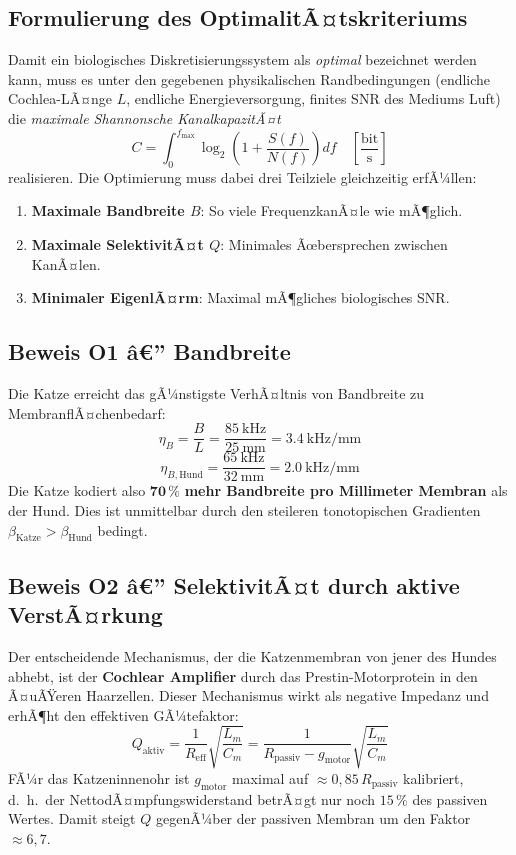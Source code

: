 ﻿\documentclass[12pt,a4paper,titlepage]{report}
\begin{document}
\subsection{Formulierung des OptimalitÃ¤tskriteriums}

Damit ein biologisches Diskretisierungssystem als \emph{optimal} bezeichnet werden kann,
muss es unter den gegebenen physikalischen Randbedingungen
(endliche Cochlea-LÃ¤nge $L$, endliche Energieversorgung, finites SNR des Mediums Luft)
die \emph{maximale Shannonsche KanalkapazitÃ¤t}
\[
C = \int_0^{f_{\max}} \log_2\!\left(1 + \frac{S(f)}{N(f)}\right)df \quad \left[\frac{\mathrm{bit}}{\mathrm{s}}\right]
\]
realisieren. Die Optimierung muss dabei drei Teilziele gleichzeitig erfÃ¼llen:
\begin{enumerate}[leftmargin=2em, label=\textbf{(O\arabic*)}]
\item \textbf{Maximale Bandbreite $B$}: So viele FrequenzkanÃ¤le wie mÃ¶glich.
\item \textbf{Maximale SelektivitÃ¤t $Q$}: Minimales Ãœbersprechen zwischen KanÃ¤len.
\item \textbf{Minimaler EigenlÃ¤rm}: Maximal mÃ¶gliches biologisches SNR.
\end{enumerate}

\subsection{Beweis O1 â€” Bandbreite}

Die Katze erreicht das gÃ¼nstigste VerhÃ¤ltnis von Bandbreite zu MembranflÃ¤chenbedarf:
\[
\eta_B = \frac{B}{L} = \frac{\SI{85}{\kilo\hertz}}{\SI{25}{\milli\meter}}
= \SI{3.4}{\kilo\hertz\per\milli\meter}
\]
\[
\eta_{B,\text{Hund}} = \frac{\SI{65}{\kilo\hertz}}{\SI{32}{\milli\meter}}
= \SI{2.0}{\kilo\hertz\per\milli\meter}
\]
Die Katze kodiert also $\mathbf{70\,\%}$ \textbf{mehr Bandbreite pro Millimeter Membran}
als der Hund. Dies ist unmittelbar durch den steileren tonotopischen Gradienten
$\beta_{\text{Katze}} > \beta_{\text{Hund}}$ bedingt.

\subsection{Beweis O2 â€” SelektivitÃ¤t durch aktive VerstÃ¤rkung}

Der entscheidende Mechanismus, der die Katzenmembran von jener des Hundes abhebt,
ist der \textbf{Cochlear Amplifier} durch das Prestin-Motorprotein in den Ã¤uÃŸeren Haarzellen.
Dieser Mechanismus wirkt als negative Impedanz und erhÃ¶ht den effektiven GÃ¼tefaktor:
\[
Q_{\text{aktiv}} = \frac{1}{R_{\text{eff}}} \sqrt{\frac{L_m}{C_m}}
= \frac{1}{R_{\text{passiv}} - g_{\text{motor}}} \sqrt{\frac{L_m}{C_m}}
\]
FÃ¼r das Katzeninnenohr ist $g_{\text{motor}}$ maximal auf
$\approx 0{,}85\,R_{\text{passiv}}$ kalibriert, d.~h.~der NettodÃ¤mpfungswiderstand
betrÃ¤gt nur noch $15\,\%$ des passiven Wertes. Damit steigt $Q$ gegenÃ¼ber der
passiven Membran um den Faktor $\approx 6{,}7$.
\end{document}
